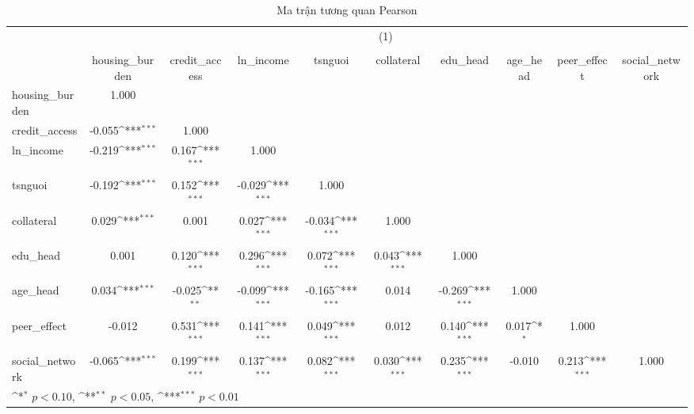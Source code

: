 \begin{table}[htbp]\centering
\def\sym#1{\ifmmode^{#1}\else\(^{#1}\)\fi}
\caption{Ma trận tương quan Pearson}
\begin{tabular}{l*{9}{c}}
\toprule
          &\multicolumn{9}{c}{(1)}                                                                                                                                                   \\
          &\multicolumn{9}{c}{}                                                                                                                                                      \\
          &housing\_burden         &credit\_access         &ln\_income         &  tsnguoi         &collateral         & edu\_head         & age\_head         &peer\_effect         &social\_network         \\
\midrule
housing\_burden&    1.000         &                  &                  &                  &                  &                  &                  &                  &                  \\
credit\_access&   -0.055\sym{***}&    1.000         &                  &                  &                  &                  &                  &                  &                  \\
ln\_income &   -0.219\sym{***}&    0.167\sym{***}&    1.000         &                  &                  &                  &                  &                  &                  \\
tsnguoi   &   -0.192\sym{***}&    0.152\sym{***}&   -0.029\sym{***}&    1.000         &                  &                  &                  &                  &                  \\
collateral&    0.029\sym{***}&    0.001         &    0.027\sym{***}&   -0.034\sym{***}&    1.000         &                  &                  &                  &                  \\
edu\_head  &    0.001         &    0.120\sym{***}&    0.296\sym{***}&    0.072\sym{***}&    0.043\sym{***}&    1.000         &                  &                  &                  \\
age\_head  &    0.034\sym{***}&   -0.025\sym{**} &   -0.099\sym{***}&   -0.165\sym{***}&    0.014         &   -0.269\sym{***}&    1.000         &                  &                  \\
peer\_effect&   -0.012         &    0.531\sym{***}&    0.141\sym{***}&    0.049\sym{***}&    0.012         &    0.140\sym{***}&    0.017\sym{*}  &    1.000         &                  \\
social\_network&   -0.065\sym{***}&    0.199\sym{***}&    0.137\sym{***}&    0.082\sym{***}&    0.030\sym{***}&    0.235\sym{***}&   -0.010         &    0.213\sym{***}&    1.000         \\
\bottomrule
\multicolumn{10}{l}{\footnotesize \sym{*} \(p<0.10\), \sym{**} \(p<0.05\), \sym{***} \(p<0.01\)}\\
\end{tabular}
\end{table}
